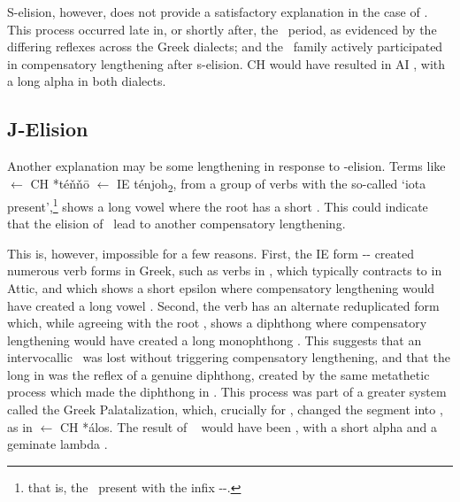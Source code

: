 
S-elision, however, does not provide a satisfactory explanation in the case of .
This process occurred late in, or shortly after, the \CH\ period, as evidenced by the differing
reflexes across the Greek dialects; and the \AI\ family actively participated in
compensatory lengthening after s-elision. CH  would have resulted
in AI , with a long alpha in both dialects.\autocite[229]{Sihler_1995}

\subsection{J-Elision}\label{subsec:JElision}
Another explanation may be some lengthening in response to \textel{\yod}-elision. Terms like
 $\gets$ CH *t\'e\v{n}\v{n}\=o $\gets$ IE t\'enjoh\textsubscript{2}, from a group of
verbs with the so-called `iota present',\footnote{that is, the \IE\ present with the infix -\textel{\yod}\eo-.}
shows a long vowel   where the root  has a short 
. This could indicate that the elision of \textel{\yod}\ lead to another
compensatory lengthening.

This is, however, impossible for a few reasons. First, the IE form -\textel{\yod}\eo- created
numerous verb forms in Greek, such as verbs in , which typically contracts to 
in Attic, and which shows a short epsilon  where compensatory lengthening
would have created a long vowel  . Second, the verb has
an alternate reduplicated form  which, while agreeing with the root ,
shows a diphthong   where compensatory lengthening would have created a long
monophthong  . This suggests that an intervocallic \textel{\yod}\ 
was lost
without triggering compensatory lengthening, and that the long   in 
was the reflex of a genuine diphthong, created by the same metathetic process which made the diphthong
in \textel{τιταίνω}. This process was part of a greater system called the Greek
Palatalization,\autocite[197]{Sihler_1995} which, crucially for , changed the segment
\textel{*λ\yod} into \textel{λλ}, as in \textel{ἄλλος} $\gets$ CH *\'al\textel{\yod}os. The result of
\CH\ \iform[L]{k\u{a}l\textel{\yod}\'os} would have been \iform[G]{κᾰλλός}, with a short alpha
\ortho{\textel{ᾰ}} and a geminate lambda \ortho{\textel{λλ}}.

